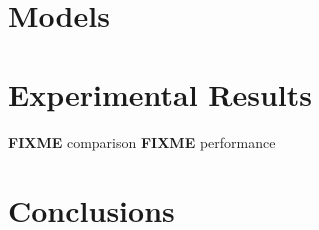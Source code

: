 \chapter{Models}



\chapter{Experimental Results} 
\textbf{FIXME} comparison
\textbf{FIXME} performance

\chapter{Conclusions}
